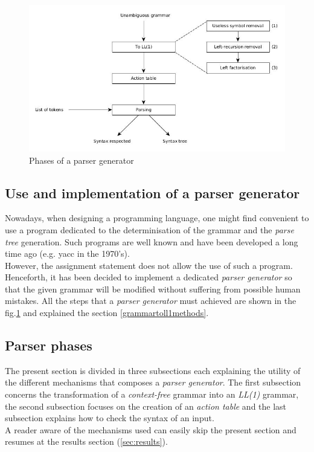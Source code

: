 \documentclass[a4paper,11pt]{article}
\begin{document}
  \begin{figure}[h!]
    \centering
    \includegraphics[scale=0.45]{./img/phase_of_parsing.jpg}
    \caption{Phases of a parser generator}
    \label{fig:parsergeneratorphases}
  \end{figure}
  
  \subsection{Use and implementation of a parser generator}
  Nowadays, when designing a programming language, one might find convenient to use a program dedicated to the determinisation of the grammar and the \textit{parse tree} generation. Such programs are well known and have been developed a long time ago (e.g. yacc in the 1970's).\\
  However, the assignment statement does not allow the use of such a program. Henceforth, it has been decided to implement a dedicated \textit{parser generator} so that the given grammar will be modified without suffering from possible human mistakes. All the steps that a \textit{parser generator} must achieved are shown in the fig.\ref{fig:parsergeneratorphases} and explained the section \ref{grammartoll1methods}.
  
  \subsection{Parser phases}
    The present section is divided in three subsections each explaining the utility of the different mechanisms that composes a \textit{parser generator}. The first subsection concerns the transformation of a \textit{context-free} grammar into an \textit{LL(1)} grammar, the second subsection focuses on the creation of an \textit{action table} and the last subsection explains how to check the syntax of an input.\\
    A reader aware of the mechanisms used can easily skip the present section and resumes at the results section (\ref{sec:results}).
  
\end{document}
